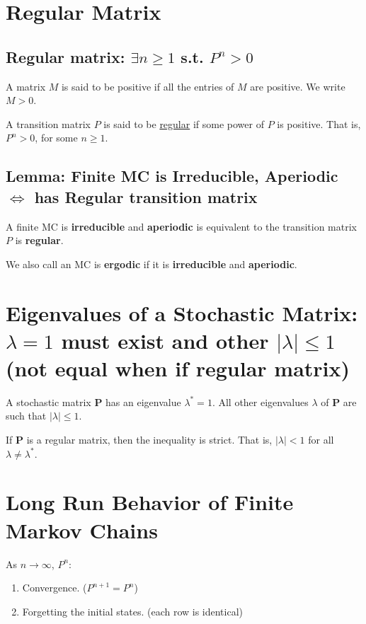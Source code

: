 \documentclass[11pt]{elegantbook}
\begin{document}
\section{Regular Matrix}
\subsection{Regular matrix: $\exists n\geq 1$ s.t. $P^n>0$}
A matrix $M$ is said to be positive if all the entries of $M$ are positive. We write $M > 0$.
\begin{definition}
    A transition matrix $P$ is said to be \underline{regular} if some power of $P$ is positive. That is, $P^n >0$, for some $n\geq 1$.
\end{definition}

\subsection{Lemma: Finite MC is Irreducible, Aperiodic $\Leftrightarrow$ has Regular transition matrix}
\begin{lemma}
    A finite MC is \textbf{irreducible} and \textbf{aperiodic} is equivalent to the transition matrix $P$ is \textbf{regular}.
\end{lemma}

We also call an MC is \textbf{ergodic} if it is \textbf{irreducible} and \textbf{aperiodic}.

\section{Eigenvalues of a Stochastic Matrix: $\lambda=1$ must exist and other $|\lambda|\leq 1$ (not equal when if regular matrix)}
\begin{lemma}
        A stochastic matrix $\boldsymbol{P}$ has an eigenvalue $\lambda^*=1$. All other eigenvalues $\lambda$ of $\boldsymbol{P}$ are such that $|\lambda| \leq 1$.
    
        If $\boldsymbol{P}$ is a regular matrix, then the inequality is strict. That is, $|\lambda|<1$ for all $\lambda \neq \lambda^*$.
\end{lemma}

\section{Long Run Behavior of Finite Markov Chains}
As $n \rightarrow \infty$, $P^n$:
\begin{enumerate}[(1)]
    \item Convergence. ($P^{n+1}=P^n$)
    \item Forgetting the initial states. (each row is identical)
\end{enumerate}
\end{document}
